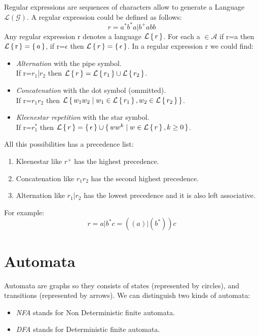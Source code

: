 Regular expressions are sequences of characters allow to generate a Language $\mathcal{L(G)}$. A regular expression could be defined as follows:
\begin{equation}
r = a^*b^*a|b^+abb
\end{equation}
Any regular expression r denotes a language $\mathcal{L}\set{r}$.
For each a $\in\mathcal{A}$ if r=a then $\mathcal{L}\set{\text{r}}=\set{a}$, if r=$\epsilon$ then $\mathcal{L}\set{r}=\set{\epsilon}$. In a regular expression r we could find:

\begin{itemize}
\item \textit{Alternation} with the pipe symbol. \\ If r=$r_1$|$r_2$ then $\mathcal{L}\set{r} = \mathcal{L}\set{r_1} \cup \mathcal{L}\set{r_2}$.
\item \textit{Concatenation} with the dot symbol (ommitted). \\ If r=$r_1r_2$ then $\mathcal{L}\set{w_1w_2 | w_1 \in \mathcal{L}\set{r_1}, w_2 \in \mathcal{L}\set{r_2}}$.
\item \textit{Kleenestar repetition} with the star symbol. \\ If r=$r_1^*$ then $\mathcal{L}\set{r}=\set{\epsilon} \cup \set{ww^k | w \in \mathcal{L}\set{r}, k \geq 0}$.
\end{itemize}
All this possibilities has a precedence list:
\begin{enumerate}
\item Kleenestar like $r^+$ has the highest precedence.
\item Concatenation like $r_1r_2$ has the second highest precedence.
\item Alternation like $r_1$|$r_2$ has the lowest precedence and it is also left associative.
\end{enumerate}
For example:
\begin{equation}
r = a|b^*c = ((a)|(b^*))c
\end{equation}

\section{Automata}

Automata are graphs so they consists of states (represented by circles), and transitions (represented by arrows).
We can distinguish two kinds of automata:
\begin{itemize}
\item \textit{NFA} stands for Non Deterministic finite automata.
\item \textit{DFA} stands for Deterministic finite automata.
\end{itemize}

